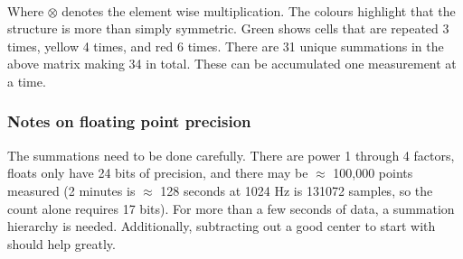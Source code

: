 \documentclass{article}
\begin{document}
\\
Where $\otimes$ denotes the element wise multiplication. The 
colours highlight that the structure is more
than simply symmetric. Green shows cells that are repeated 3 times,
yellow 4 times, and red 6 times. There are 31 unique summations
in the above matrix making 34 in total. These can be accumulated
one measurement at a time.
%
\subsubsection*{Notes on floating point precision}
The summations need to be done carefully. There are power 1 through
4 factors, floats only have 24 bits of precision, and there may be
$\approx$ 100,000 points measured (2 minutes is $\approx$ 128 seconds at 1024 Hz is
131072 samples, so the count alone requires 17 bits). For more than a
few seconds of data, a summation hierarchy is needed. Additionally, 
subtracting out a good center to start with should help greatly.
%
\end{document}
